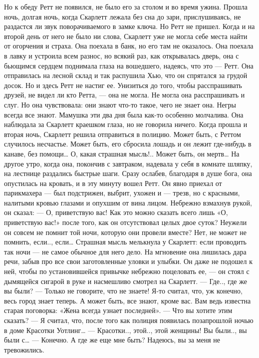 Но к обеду Ретт не появился, не было его за столом и во время ужина. Прошла ночь, долгая ночь, когда Скарлетт лежала без сна до зари, прислушиваясь, не раздастся ли звук поворачиваемого в замке ключа. Но Ретт не пришел. Когда и на второй день от него не было ни слова, Скарлетт уже не могла себе места найти от огорчения и страха. Она поехала в банк, но его там не оказалось. Она поехала в лавку и устроила всем разнос, но всякий раз, как открывалась дверь, она с бьющимся сердцем поднимала глаза на вошедшего, надеясь, что это — Ретт. Она отправилась на лесной склад и так распушила Хью, что он спрятался за грудой досок. Но и здесь Ретт не настиг ее.
Унизиться до того, чтобы расспрашивать друзей, не видел ли кто Ретта, — она не могла. Не могла она расспрашивать и слуг. Но она чувствовала: они знают что-то такое, чего не знает она. Негры всегда все знают. Мамушка эти два дня была как-то особенно молчалива. Она наблюдала за Скарлетт краешком глаза, но не говорила ничего. Когда прошла и вторая ночь, Скарлетт решила отправиться в полицию. Может быть, с Реттом случилось несчастье. Может быть, его сбросила лошадь и он лежит где-нибудь в канаве, без помощи… О, какая страшная мысль!.. Может быть, он мертв…
На другое утро, когда она, покончив с завтраком, надевала у себя в комнате шляпку, на лестнице раздались быстрые шаги. Сразу ослабев, благодаря в душе бога, она опустилась на кровать, и в эту минуту вошел Ретт. Он явно приехал от парикмахера — был подстрижен, выбрит, ухожен и — трезв, но с красными, налитыми кровью глазами и опухшим от вина лицом. Небрежно взмахнув рукой, он сказал:
— О, приветствую вас!
Как это можно сказать всего лишь «О, приветствую вас!» после того, как он отсутствовал целых двое суток? Неужели он совсем не помнит той ночи, которую они провели вместе? Нет, не может не помнить, если.., если… Страшная мысль мелькнула у Скарлетт: если проводить так ночи — не самое обычное для него дело. На мгновение она лишилась дара речи, забыв про все свои заготовленные уловки и улыбки. Он даже не подошел к ней, чтобы по установившейся привычке небрежно поцеловать ее, — он стоял с дымящейся сигарой в руке и насмешливо смотрел на Скарлетт.
— Где.., где же вы были?
— Только не говорите, что не знаете! Я-то считал, что, уж конечно, весь город знает теперь. А может быть, все знают, кроме вас. Вам ведь известна старая поговорка: «Жена всегда узнает последней».
— Что вы хотите этим сказать?
— Я считал, что, после того как полиция появилась позапрошлой ночью в доме Красотки Уотлинг…
— Красотки.., этой.., этой женщины! Вы были.., вы были с…
— Конечно. А где же еще мне быть? Надеюсь, вы за меня не тревожились.
